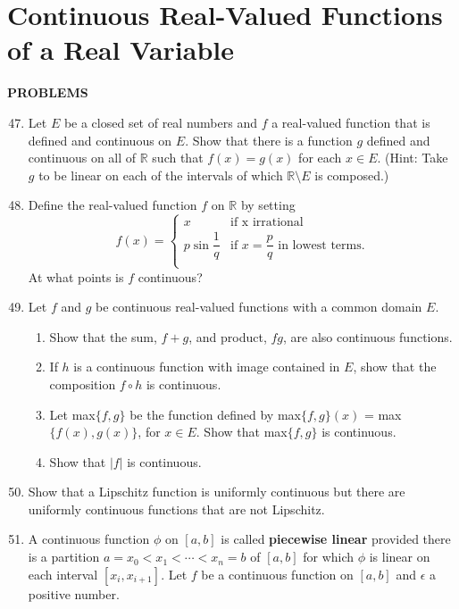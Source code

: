 \documentclass[a4paper,10pt]{book}
\theoremstyle{plain} %
\begin{document}
\section{Continuous Real-Valued Functions of a Real Variable}

\begin{center}
	\textbf{PROBLEMS}
\end{center}
\begin{enumerate}
	\setcounter{enumi}{46}
	\item Let $E$ be a closed set of real numbers and $f$ a real-valued function that is defined and continuous on $E$. Show that there is a function $g$ defined and continuous on all of $\mathbb{R}$ such that $f(x) = g(x)$ for each $x \in E$. (Hint: Take $g$ to be linear on each of the intervals of which $\mathbb{R} \setminus E$ is composed.)
	\item Define the real-valued function $f$ on $\mathbb{R}$ by setting 
	\[ 
	f(x) =
	\begin{cases} 
		x & \text{if x irrational}\\
		p \sin \dfrac{1}{q} & \text{if } x = \dfrac{p}{q} \text{ in lowest terms.} \\
	\end{cases}
	\]
	At what points is $f$ continuous?
	\item Let $f$ and $g$ be continuous real-valued functions with a common domain $E$.
	\begin{enumerate}[label=(\roman*),align=left]
        \item Show that the sum, $f+g$, and product, $fg$, are also continuous functions.
        \item If $h$ is a continuous function with image contained in $E$, show that the composition $f \circ h$ is continuous.
        \item Let max$\{f,g\}$ be the function defined by max$\{f,g\}(x)$ = max$\{f(x),g(x)\}$, for $x \in E$. Show that max$\{f,g\}$ is continuous.
        \item Show that $|f|$ is continuous.
    \end{enumerate}
	\item Show that a Lipschitz function is uniformly continuous but there are uniformly continuous functions that are not Lipschitz.
	\item A continuous function $\phi$ on $[a,b]$ is called \textbf{piecewise linear} provided there is a partition $a=x_0<x_1< \cdots <x_n = b$ of $[a,b]$ for which $\phi$ is linear on each interval $[x_i, x_{i+1}]$. Let $f$ be a continuous function on $[a,b]$ and $\epsilon$ a positive number. 

\end{enumerate}
\end{document}
